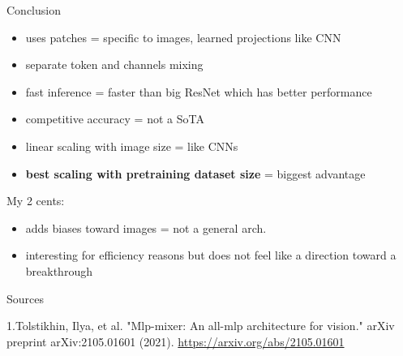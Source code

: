 \documentclass{beamer}
\begin{document}
\begin{frame}{Conclusion}


\begin{itemize}
\item uses patches = specific to images, learned projections like CNN
\item separate token and channels mixing
\item fast inference = faster than big ResNet which has better performance
\item competitive accuracy = not a SoTA
\item linear scaling with image size = like CNNs
\item \textbf{best scaling with pretraining dataset size} = biggest advantage
\end{itemize}

\vfill

My 2 cents:
\begin{itemize}
\item adds biases toward images = not a general arch.
\item interesting for efficiency reasons but does not feel like a direction toward a breakthrough
\end{itemize}

\end{frame}
\begin{frame}{Sources}
\begin{thebibliography}{0}

   1.Tolstikhin, Ilya, et al. "Mlp-mixer: An all-mlp architecture for vision." arXiv preprint arXiv:2105.01601 (2021). \url{https://arxiv.org/abs/2105.01601} 
  
\end{thebibliography}

\end{frame}

 
\end{document}
